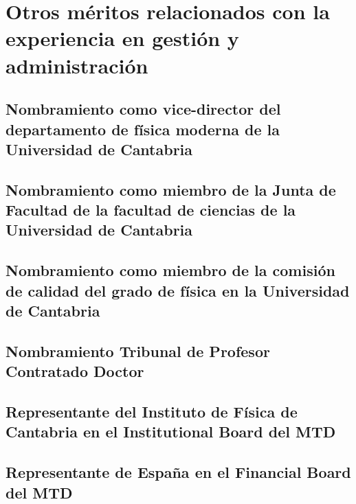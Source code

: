 \documentclass[a4paper, 11pt, twoside, openright]{report}
\begin{document}
\section{Otros méritos relacionados con la experiencia en gestión y administración}

\subsection{Nombramiento como vice-director del departamento de física moderna de la Universidad de Cantabria}

\subsection{Nombramiento como miembro de la Junta de Facultad de la facultad de ciencias de la Universidad de Cantabria}

\subsection{Nombramiento como miembro de la comisión de calidad del grado de física en la Universidad de Cantabria}

\subsection{Nombramiento Tribunal de Profesor Contratado Doctor}

\subsection{Representante del Instituto de Física de Cantabria en el Institutional Board del MTD}

\subsection{Representante de España en el Financial Board del MTD}

\end{document}
